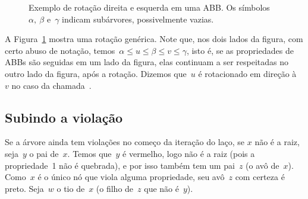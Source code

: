 \documentclass[../../main.tex]{subfiles}
\begin{document}
\begin{figure}
\centering
{}
\caption{Exemplo de rotação direita e esquerda em uma ABB. Os símbolos~$\alpha,~\beta$ e~$\gamma$ indicam subárvores, possivelmente vazias.} \label{fig:rot_ex}
\end{figure}

A Figura~\ref{fig:rot_ex} mostra uma rotação genérica. Note que, nos dois lados da figura, com certo abuso de notação, temos~${\alpha \leq u \leq \beta \leq v \leq \gamma}$, isto é, se as propriedades de ABBs são seguidas em um lado da figura, elas continuam a ser respeitadas no outro lado da figura, após a rotação. Dizemos que~$u$ é rotacionado em direção à~$v$ no caso da chamada~. %

\subsection{Subindo a violação}

Se a árvore ainda tem violações no começo da iteração do laço, se $x$ não é a raiz, seja~$y$ o pai de~$x$. Temos que~$y$ é vermelho, logo não é a raiz (pois a propriedade~1 não é quebrada), e por isso também tem um pai~$z$ (o avô de~$x$). Como~$x$ é o único nó que viola alguma propriedade, seu avô~$z$ com certeza é preto. Seja~$w$ o tio de~$x$ (o filho de~$z$ que não é~$y$).
\end{document}
